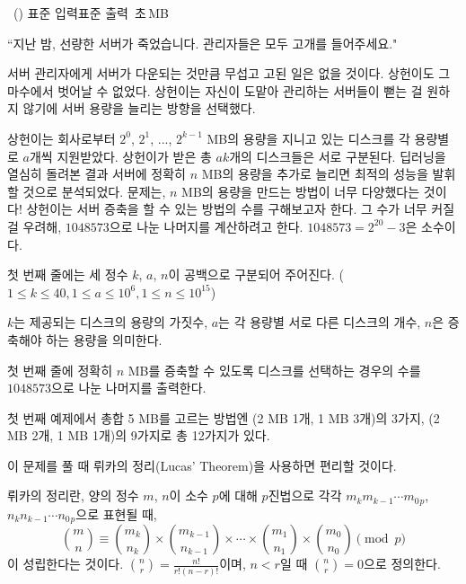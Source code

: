 \begin{problem}{\kcpcprobserver\ (\kcpcprobservershort)}
    {표준 입력}{표준 출력}
    {\kcpcprobservertime\,초}{\kcpcprobservermemory\,MB}{}
    
    ``지난 밤, 선량한 서버가 죽었습니다. 관리자들은 모두 고개를 들어주세요."
    
    서버 관리자에게 서버가 다운되는 것만큼 무섭고 고된 일은 없을 것이다. 상헌이도 그 마수에서 벗어날 수 없었다. 상헌이는 자신이 도맡아 관리하는 서버들이 뻗는 걸 원하지 않기에 서버 용량을 늘리는 방향을 선택했다.
    
    상헌이는 회사로부터 $2^0$, $2^1$, ..., $2^{k-1}$ MB의 용량을 지니고 있는 디스크를 각 용량별로 $a$개씩 지원받았다. 상헌이가 받은 총 $ak$개의 디스크들은 서로 구분된다. 딥러닝을 열심히 돌려본 결과 서버에 정확히 $n$ MB의 용량을 추가로 늘리면 최적의 성능을 발휘할 것으로 분석되었다. 문제는, $n$ MB의 용량을 만드는 방법이 너무 다양했다는 것이다! 상헌이는 서버 증축을 할 수 있는 방법의 수를 구해보고자 한다. 그 수가 너무 커질 걸 우려해, $1048573$으로 나눈 나머지를 계산하려고 한다. 
    $1048573 = 2^{20} - 3$은 소수이다.
    
    \InputFile
    첫 번째 줄에는 세 정수 $k$, $a$, $n$이 공백으로 구분되어 주어진다. ($1 \leq k \leq 40, 1 \leq a \leq 10^6, 1 \leq n \leq 10^{15}$)
    
    $k$는 제공되는 디스크의 용량의 가짓수, $a$는 각 용량별 서로 다른 디스크의 개수, $n$은 증축해야 하는 용량을 의미한다.
    
    \OutputFile
    첫 번째 줄에 정확히 $n$ MB를 증축할 수 있도록 디스크를 선택하는 경우의 수를 $1048573$으로 나눈 나머지를 출력한다.
    
    \Examples
    \begin{example}
    \end{example}
    \Explanation
    첫 번째 예제에서 총합 5 MB를 고르는 방법엔 (2 MB 1개, 1 MB 3개)의 3가지, (2 MB 2개, 1 MB 1개)의 9가지로 총 12가지가 있다.
    
    \Note
    이 문제를 풀 때 뤼카의 정리(Lucas' Theorem)을 사용하면 편리할 것이다. 
    
    뤼카의 정리란, 양의 정수 $m$, $n$이 소수 $p$에 대해 $p$진법으로 각각 $m_{k}m_{k-1}\cdots m_{0}{_{p}}$, $n_{k}n_{k-1}\cdots n_{0}{_{p}}$으로 표현될 때,
    $$
    \binom{m}{n} \equiv \binom{m_k}{n_k} \times \binom{m_{k-1}}{n_{k-1}} \times \cdots \times \binom{m_1}{n_1} \times \binom{m_0}{n_0} \pmod p
    $$
    이 성립한다는 것이다. $\binom{n}{r} = \frac{n!}{r!(n-r)!}$이며, $n < r$일 때 $\binom{n}{r} = 0$으로 정의한다.
    

\end{problem}
